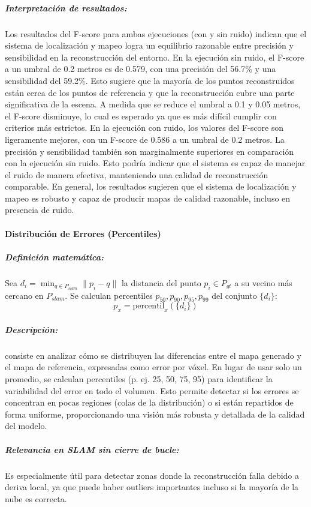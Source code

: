 \documentclass[12pt, a4paper, twoside]{article}
\begin{document}
\subparagraph{Interpretación de resultados:}
Los resultados del F-score para ambas ejecuciones (con y sin ruido) indican que el sistema de localización y mapeo logra un equilibrio razonable entre precisión y sensibilidad en la reconstrucción
del entorno.\newline
En la ejecución sin ruido, el F-score a un umbral de 0.2 metros es de 0.579, con una precisión del 56.7\% y una sensibilidad del 59.2\%. Esto sugiere que la mayoría de los puntos reconstruidos están
cerca de los puntos de referencia y que la reconstrucción cubre una parte significativa de la escena.
A medida que se reduce el umbral a 0.1 y 0.05 metros, el F-score disminuye, lo cual es esperado ya que es más difícil cumplir con criterios más estrictos.\newline
En la ejecución con ruido, los valores del F-score son ligeramente mejores, con un F-score de 0.586 a un umbral de 0.2 metros. La precisión y sensibilidad también son marginalmente superiores en 
comparación con la ejecución sin ruido.
Esto podría indicar que el sistema es capaz de manejar el ruido de manera efectiva, manteniendo una calidad de reconstrucción comparable.\newline
En general, los resultados sugieren que el sistema de localización y mapeo es robusto y capaz de producir mapas de calidad razonable, incluso en presencia de ruido.

\paragraph{Distribución de Errores (Percentiles)}

\subparagraph{Definición matemática:}
Sea $d_i = \min_{q \in P_{slam}} \|p_i - q\|$ la distancia del punto $p_i \in P_{gt}$ a su vecino más cercano en $P_{slam}$.  
Se calculan percentiles $p_{50}, p_{90}, p_{95}, p_{99}$ del conjunto $\{d_i\}$:
\[
p_x = \text{percentil}_x(\{ d_i \})
\]

\subparagraph{Descripción:}
consiste en analizar cómo se distribuyen las diferencias entre el mapa generado y el mapa de referencia, expresadas como error por vóxel.
 En lugar de usar solo un promedio, se calculan percentiles (p. ej. 25, 50, 75, 95) para identificar la variabilidad del error en todo el 
 volumen. Esto permite detectar si los errores se concentran en pocas regiones (colas de la distribución) o si están repartidos de forma 
 uniforme, proporcionando una visión más robusta y detallada de la calidad del modelo.

\subparagraph{Relevancia en SLAM sin cierre de bucle:}
Es especialmente útil para detectar zonas donde la reconstrucción falla debido a deriva local, ya que puede haber outliers 
importantes incluso si la mayoría de la nube es correcta.
\end{document}
